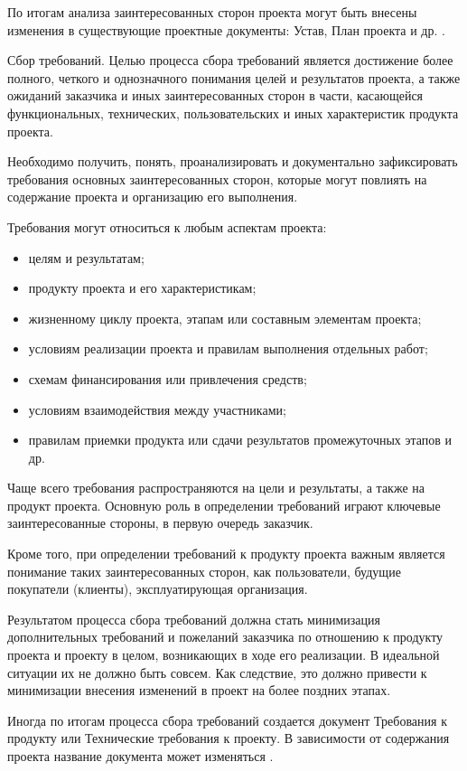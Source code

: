 По итогам анализа заинтересованных сторон проекта могут быть внесены изменения в существующие проектные документы: Устав,
План проекта и др. \cite[141--143]{polkovnikov}.

Сбор требований.
Целью процесса сбора требований является достижение более пол­ного, четкого и однозначного понимания целей и результатов проекта, а также ожиданий заказчика и иных заинтересованных сторон в ча­сти, касающейся функциональных, технических, пользовательских и иных характеристик продукта проекта.

Необходимо получить, понять, проанализировать и документаль­но зафиксировать требования основных заинтересованных сторон, которые могут повлиять на содержание проекта и организацию его выполнения.

Требования могут относиться к любым аспектам проекта:
\begin{itemize}
	\item целям и результатам;
	\item продукту проекта и его характеристикам;
	\item жизненному циклу проекта, этапам или составным элементам проекта;
	\item условиям реализации проекта и правилам выполнения отдельных работ;
	\item схемам финансирования или привлечения средств;
	\item условиям взаимодействия между участниками;
	\item правилам приемки продукта или сдачи результатов промежуточ­ных этапов и др.
\end{itemize}

Чаще всего требования распространяются на цели и результаты, а также на продукт проекта.
Основную роль в определении требова­ний играют ключевые заинтересованные стороны, в первую очередь заказчик.

Кроме того, при определении требований к продукту проекта важ­ным является понимание таких заинтересованных сторон, как поль­зователи, будущие покупатели (клиенты), эксплуатирующая орга­низация.

Результатом процесса сбора требований должна стать минимизация дополнительных требований и пожеланий заказчика по отношению к продукту проекта и проекту в целом, возникающих в ходе его реализа­ции.
В идеальной ситуации их не должно быть совсем. Как следствие, это должно привести к минимизации внесения изменений в проект на более поздних этапах.

Иногда по итогам процесса сбора требований создается документ Требования к продукту или Технические требования к проекту.
В зависимости от содержания проекта название документа может из­меняться \cite[143--144]{polkovnikov}.

